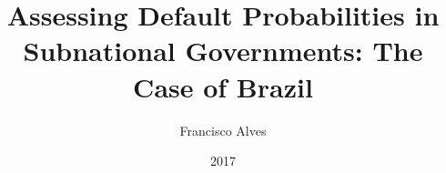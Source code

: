 \documentclass[12pt,oneside,a4paper]{report}
\title{Assessing Default Probabilities in Subnational Governments: The Case of Brazil}
\author{Francisco Alves}
\date{2017}
\begin{document}
\maketitle










{\footnotesize
}
\end{document}
